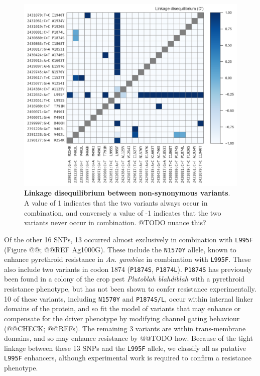 \documentclass[a4paper,11pt,abstracton]{scrartcl}
\begin{document}
%
\begin{figure}[!t]

  \centering
  
  \includegraphics[width=\linewidth]{artwork/fig_ld.png}
  
  \caption{\textbf{Linkage disequilibrium between non-synonymous variants}. A value of 1 indicates that the two variants always occur in combination, and conversely a value of -1 indicates that the two variants never occur in combination. @TODO nuance this?}
  
  \label{fig:ld}
 
\end{figure}


%
Of the other 16 SNPs, 13 occurred almost exclusively in combination with \texttt{L995F} (Figure @@; @@REF Ag1000G).
%
These include the \texttt{N1570Y} allele, known to enhance pyrethroid resistance in \textit{An. gambiae} in combination with \texttt{L995F}.
%
These also include two variants in codon 1874 (\texttt{P1874S}, \texttt{P1874L}). \texttt{P1874S} has previously been found in a colony of the crop pest \textit{Plutoblah blahdiblah} with a pyrethroid resistance phenotype, but has not been shown to confer resistance experimentally.
%
10 of these variants, including \texttt{N1570Y} and \texttt{P1874S/L}, occur within internal linker domains of the protein, and so fit the model of variants that may enhance or compensate for the driver phenotype by modifying channel gating behaviour (@@CHECK; @@REFs).
%
The remaining 3 variants are within trans-membrane domains, and so may enhance resistance by @@TODO how.
%
Because of the tight linkage between these 13 SNPs and the \texttt{L995F} allele, we classify all as putative \texttt{L995F} enhancers, although experimental work is required to confirm a resistance phenotype.
\end{document}
